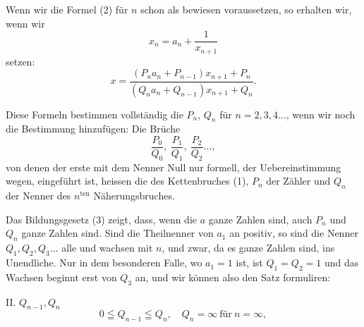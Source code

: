 
Wenn wir die Formel (2) f\"ur $n$ schon als bewiesen voraussetzen, so erhalten wir, wenn wir
\[
x_n = a_n + \frac{1}{x_{n+1}}
\]
setzen:
\[
x = \frac{(P_n a_n + P_{n-1}) x_{n+1} + P_n}{(Q_n a_n + Q_{n-1}) x_{n+1} + Q_n}.
\]

Diese Formeln bestimmen vollst\"andig die $P_n$, $Q_n$ f\"ur $n = 2, 3, 4 \ldots$, wenn wir noch die Bestimmung hinzuf\"ugen:
Die Br\"uche
\[
\frac{P_0}{Q_0}, \ \frac{P_1}{Q_1}, \ \frac{P_2}{Q_2} \ldots,
\]
von denen der erste mit dem Nenner Null nur formell, der Uebereinstimmung wegen, eingef\"uhrt ist, heissen die  des Kettenbruches (1), $P_n$ der Z\"ahler und $Q_n$ der Nenner des $n^{\mathrm{ten}}$ N\"aherungsbruches.

Das Bildungsgesetz (3) zeigt, dass, wenn die $a$ ganze Zahlen sind, auch $P_n$ und $Q_n$ ganze Zahlen sind. Sind die Theilnenner von $a_1$ an positiv, so sind die Nenner $Q_1, Q_2, Q_3 \ldots$ alle  und wachsen mit $n$, und zwar, da es ganze Zahlen sind, ins Unendliche. Nur in dem besonderen Falle, wo $a_1 = 1$ ist, ist $Q_1 = Q_2 = 1$ und das Wachsen beginnt erst von $Q_3$ an, und wir k\"onnen also den Satz formuliren:

II.  $Q_{n-1}, Q_n$ 
\[
0 \leqq Q_{n-1} \leqq Q_n, \quad Q_n = \infty \ \text{f\"ur} \ n = \infty,
\]

